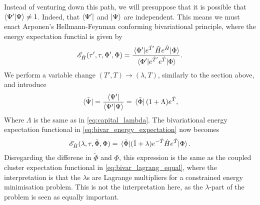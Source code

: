 Instead of venturing down this path, we will presuppose that it is possible
that $\braket{{\Psi}'}{\Psi} \neq 1$. Indeed, that $\bra{{\Psi}'}$ 
and $\ket{\Psi}$ are independent. This means we must enact
Arponen's\cite{arponen1983variational} Hellmann-Feynman conforming bivariational 
principle, where the energy expectation functial is given by 
\begin{equation}
    \label{eq:bivar_energy_expectation}
    \mathscr{E}_{\hat{H}}(\tau', \tau, \Phi', \Phi)
    = \frac{\mel*{\Phi'}{e^{\hat{T}'}\hat{H}e^{\hat{H}}}{\Phi}}
    {\mel*{\Phi'}{e^{\hat{T}'}e^{\hat{T}}}{\Phi}}.
\end{equation}
We perform a variable change $(T', T)\to(\lambda, T)$, similarly to the section above, 
and introduce
\begin{equation}
    \bra*{\tilde{\Psi}} = \frac{\bra{\Psi'}}{\braket{\Psi'}{\Psi}}
    = \bra*{\tilde{\Phi}} (1 + \Lambda) e^{\hat{T}},
\end{equation}
Where $\Lambda$ is the same as in \autoref{eq:capital_lambda}.
The bivariational energy expectation functional in \autoref{eq:bivar_energy_expectation}
now becomes
\begin{equation}
    \mathscr{E}_{\hat{H}}(\lambda, \tau, \tilde{\Phi}, \Phi)
    = \mel*{\tilde{\Phi}}{(\hat{1} + \lambda)e^{-\hat{T}}\hat{H}e^{\hat{T}} }{\Phi}.
\end{equation}
Disregarding the differene in $\tilde{\Phi}$ and $\Phi$, this expression is the 
same as the coupled cluster expectation functional in \autoref{eq:bivar_lagrang_equal},
where the interpretation is that the $\lambda$s are Lagrange multipliers 
for a constrained energy minimisation problem. This is not the interpretation 
here, as the $\lambda$-part of the problem is seen as equally important.

